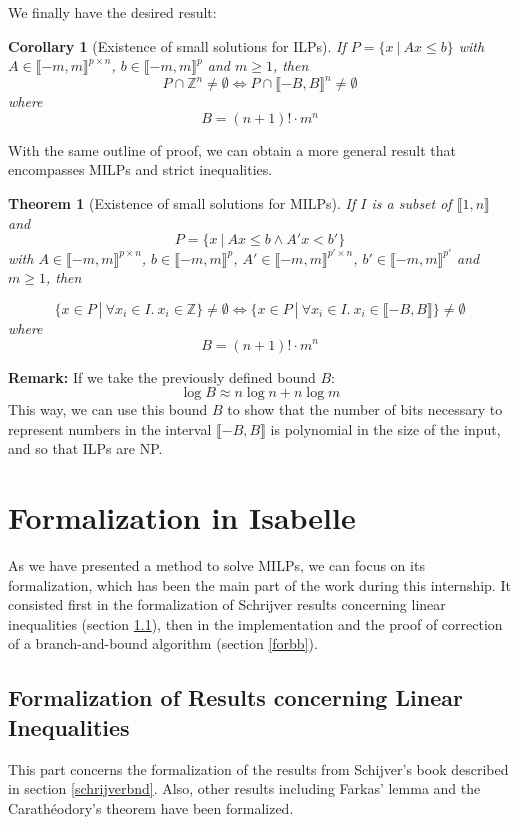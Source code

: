 \documentclass{article}
\newcommand{\ints}{\mathbb{Z}}
\newtheorem{theorem}{Theorem}
\newtheorem{corollary}{Corollary}
\begin{document}
We finally have the desired result:

\begin{corollary}[Existence of small solutions for ILPs]
  \label{small-ilp}
  If $P = \{x~|~Ax \leqslant b\}$ with
  $A \in \llbracket -m, m \rrbracket^{p \times n}$,
  $b \in \llbracket -m, m \rrbracket^p$ and $m \geqslant 1$, then
  $$P \cap \ints^n \neq \emptyset \Longleftrightarrow
  P \cap \llbracket -B, B \rrbracket^n \neq \emptyset$$ where
  $$B = (n + 1)! \cdot m^n$$
\end{corollary}

With the same outline of proof, we can obtain a more general result that
encompasses MILPs and strict inequalities. 

\begin{theorem}[Existence of small solutions for MILPs]
  \label{small-milp}
  If $I$ is a subset of $\llbracket 1, n \rrbracket$ and
  $$P = \{x~|~Ax \leqslant b \wedge A'x < b'\}$$ with
  $A \in \llbracket -m, m \rrbracket^{p \times n}$,
  $b \in \llbracket -m, m \rrbracket^p$,
  $A' \in \llbracket -m, m \rrbracket^{p' \times n}$,
  $b' \in \llbracket -m, m \rrbracket^{p'}$ and $m \geqslant 1$, then

  $$\{x \in P~|~\forall x_i \in I.~x_i \in \ints\} \neq \emptyset
      \Longleftrightarrow
    \{x \in P~|~\forall x_i \in I.~x_i \in \llbracket -B, B \rrbracket\}
      \neq \emptyset$$
  where
  $$B = (n + 1)! \cdot m^n$$
\end{theorem}

\textbf{Remark:} If we take the previously defined bound $B$:
$$\log B \approx n \log n + n \log m$$
This way, we can use this bound $B$ to show that the number of bits
necessary to represent numbers in the interval $\llbracket -B, B \rrbracket$
is polynomial in the size of the input, and so that ILPs are NP.

\section{Formalization in Isabelle}
As we have presented a method to solve MILPs, we can focus on its
formalization, which has been the main part of the work during this internship.
It consisted first in the formalization of Schrijver results concerning linear
inequalities (section \ref{forlineq}), then in the implementation and the proof
of correction of a branch-and-bound algorithm (section \ref{forbb}).

\subsection{Formalization of Results concerning Linear Inequalities}
\label{forlineq}
This part concerns the formalization of the results from Schijver's book
described in section \ref{schrijverbnd}.
Also, other results including Farkas' lemma and the Carathéodory's theorem
have been formalized.
\end{document}
